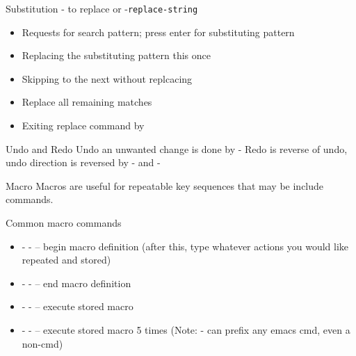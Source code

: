 \documentclass[newPxFont,sthlmFooter,nooffset]{beamer}
\begin{document}
\begin{frame}[t]{Substitution}
-\keystroke{$\%$} to replace or -\texttt{replace-string}
\begin{itemize}
\item Requests for search pattern; press enter for substituting pattern
\item Replacing the substituting pattern this once 
\item Skipping to the next without replcacing 
\item Replace all remaining matches \keystroke{!}
\item Exiting replace command by 
\end{itemize}

\end{frame}


\begin{frame}[t]{Undo and Redo}
Undo an unwanted change is done by -\keystroke{\_}
\bigskip
Redo is reverse of undo, undo direction is reversed by - and -\keystroke{\_}

\end{frame}


\begin{frame}[t]{Macro}
Macros are useful for repeatable key sequences that may be include commands.

\bigskip
Common macro commands
\begin{itemize}
\item {}- - \keystroke{(}– begin macro definition (after this, type whatever actions you would like repeated and stored)
\item {}- - \keystroke{)}– end macro definition
\item {}- -  – execute stored macro
\item {}-  - – execute stored macro 5 times (Note: - can prefix any emacs cmd, even a non-cmd)
\end{itemize}
\end{frame}
\end{document}
